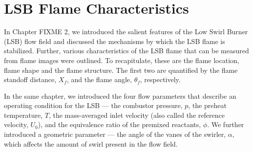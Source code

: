 \chapter{LSB Flame Characteristics}






In Chapter FIXME 2, we introduced the salient features of the Low Swirl Burner (LSB) flow field and discussed the mechanisms by which the LSB flame is stabilized.
Further, various characteristics of the LSB flame that can be measured from flame images were outlined.
To recapitulate, these are the flame location, flame shape and the flame structure.
The first two are quantified by the flame standoff distance, \(X_f\), and the flame angle, \(\theta_f\), respectively.

In the same chapter, we introduced the four flow parameters that describe an operating condition for the LSB --- the combustor pressure, \(p\), the preheat temperature, \(T\), the mass-averaged inlet velocity (also called the reference velocity, \(U_0\)), and the equivalence ratio of the premixed reactants, \(\phi\).
We further introduced a geometric parameter --- the angle of the vanes of the swirler, \(\alpha\), which affects the amount of swirl present in the flow field.

